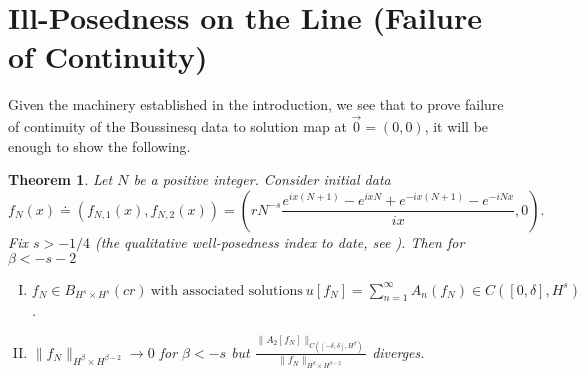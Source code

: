 \documentclass[12pt,reqno]{amsart}
\numberwithin{equation}{section}  %
\newtheorem{theorem}{Theorem}[section]
\begin{document}
\section{Ill-Posedness on the Line (Failure of Continuity)} 
Given the machinery established in the introduction, we see that to prove failure of continuity of the Boussinesq data to solution map at $\vec{0} =
(0, 0)$, it will be enough to show the
following.
%
%
%
%
%
%
%
%
%
%
  \begin{theorem}
  Let $N$ be a positive integer. Consider initial data $$f_{N}(x) \doteq (f_{N,1}(x), f_{N,2}(x)) 
  = (r N^{-s} \frac{e^{ix(N+1)} - e^{ix N} + e^{-ix(N+1)} - e^{-iNx}}{ix} , 0).$$
  Fix $ s > -1/4$ (the qualitative well-posedness index to date, see \cite{Farah:2009uq}). Then for $\beta < -s -2$
    \begin{enumerate}[(I)]
      \item{$ f_{N} \in B_{H^{s} \times H^{s}}(cr) \ \text{with associated
    solutions}
    \ u[f_{N}] = \sum_{n=1}^{\infty} A_{n}(f_{N}) \in C([0, \delta],
    H^{s})$}.
    \\
  \item
    $\|f_{N}\|_{H^{\beta} \times H^{\beta-2}} \to 0$ for $\beta < -s$ but 
    $ \displaystyle \frac{\|A_{2}[f_{N}]\|_{C( [-\delta, \delta], H^{\beta})}}{\| f_{N} \|_{H^{\beta} \times H^{\beta -2}}}$ diverges.
\end{enumerate}
\label{thm:ill-pos-real}
\end{theorem}
\end{document}
